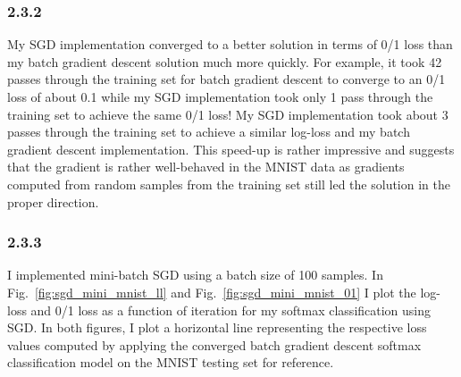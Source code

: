 \documentclass[12pt]{amsart}
\begin{document}
\subsubsection*{2.3.2}

My SGD implementation converged to a better solution in terms of 0/1 loss than my batch gradient descent solution much more quickly.  For example, it took 42 passes through the training set for batch gradient descent to converge to an 0/1 loss of about 0.1 while my SGD implementation took only 1 pass through the training set to achieve the same 0/1 loss!  My SGD implementation took about 3 passes through the training set to achieve a similar log-loss and my batch gradient descent implementation.  This speed-up is rather impressive and suggests that the gradient is rather well-behaved in the MNIST data as gradients computed from random samples from the training set still led the solution in the proper direction.

\subsubsection*{2.3.3}

I implemented mini-batch SGD using a batch size of 100 samples.  In Fig.~\ref{fig:sgd_mini_mnist_ll} and Fig.~\ref{fig:sgd_mini_mnist_01} I plot the log-loss and 0/1 loss as a function of iteration for my softmax classification using SGD.  In both figures, I plot a horizontal line representing the respective loss values computed by applying the converged batch gradient descent softmax classification model on the MNIST testing set for reference.
\end{document}
